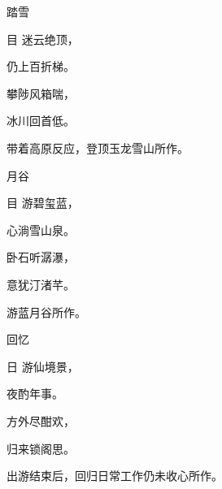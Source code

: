 \documentclass{article}
\newenvironment{poem}[3]{
\begin{minipage}{\textwidth}
\begin{pinyinscope}\begin{center}\Large\linespread{1.4}\selectfont #2\end{center}\end{pinyinscope}
\begin{pinyinscope}
	\begin{center}
	\Large\linespread{1.4}\rmfamily\selectfont #3
}{\end{center}
\end{pinyinscope}
\end{minipage}
}
\begin{document}

\bigbreak


\begin{poem}{}{踏雪}
目迷云绝顶，

仍上百折梯。

攀陟风箱喘，

冰川回首低。
\end{poem}

带着高原反应，登顶玉龙雪山所作。

\bigbreak


\begin{poem}{}{月谷}
目游碧玺蓝，

心淌雪山泉。

卧石听潺瀑，

意犹汀渚芊。
\end{poem}

游蓝月谷所作。

\bigbreak


\begin{poem}{}{回忆}
日游仙境景，

夜酌{}年事。

方外尽酣欢，

归来锁阁思。
\end{poem}

出游结束后，回归日常工作仍未收心所作。










\end{document}
